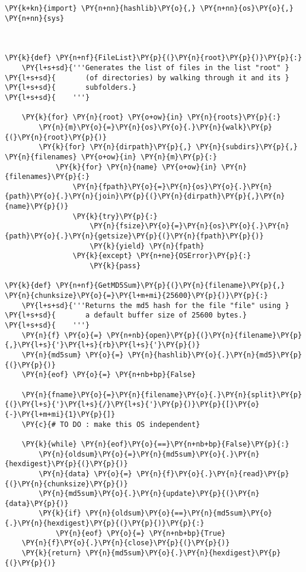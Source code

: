\begin{Verbatim}[commandchars=\\\{\}]
\PY{k+kn}{import} \PY{n+nn}{hashlib}\PY{o}{,} \PY{n+nn}{os}\PY{o}{,} \PY{n+nn}{sys}



\PY{k}{def} \PY{n+nf}{FileList}\PY{p}{(}\PY{n}{root}\PY{p}{)}\PY{p}{:}
    \PY{l+s+sd}{'''Generates the list of files in the list "root" }
\PY{l+s+sd}{       (of directories) by walking through it and its }
\PY{l+s+sd}{       subfolders.}
\PY{l+s+sd}{    '''}

    \PY{k}{for} \PY{n}{root} \PY{o+ow}{in} \PY{n}{roots}\PY{p}{:}
        \PY{n}{m}\PY{o}{=}\PY{n}{os}\PY{o}{.}\PY{n}{walk}\PY{p}{(}\PY{n}{root}\PY{p}{)}
        \PY{k}{for} \PY{n}{dirpath}\PY{p}{,} \PY{n}{subdirs}\PY{p}{,} \PY{n}{filenames} \PY{o+ow}{in} \PY{n}{m}\PY{p}{:}
            \PY{k}{for} \PY{n}{name} \PY{o+ow}{in} \PY{n}{filenames}\PY{p}{:}
                \PY{n}{fpath}\PY{o}{=}\PY{n}{os}\PY{o}{.}\PY{n}{path}\PY{o}{.}\PY{n}{join}\PY{p}{(}\PY{n}{dirpath}\PY{p}{,}\PY{n}{name}\PY{p}{)}
                \PY{k}{try}\PY{p}{:}
                    \PY{n}{fsize}\PY{o}{=}\PY{n}{os}\PY{o}{.}\PY{n}{path}\PY{o}{.}\PY{n}{getsize}\PY{p}{(}\PY{n}{fpath}\PY{p}{)}
                    \PY{k}{yield} \PY{n}{fpath}
                \PY{k}{except} \PY{n+ne}{OSError}\PY{p}{:}
                    \PY{k}{pass}

\PY{k}{def} \PY{n+nf}{GetMD5Sum}\PY{p}{(}\PY{n}{filename}\PY{p}{,} \PY{n}{chunksize}\PY{o}{=}\PY{l+m+mi}{25600}\PY{p}{)}\PY{p}{:}
    \PY{l+s+sd}{'''Returns the md5 hash for the file "file" using }
\PY{l+s+sd}{       a default buffer size of 25600 bytes.}
\PY{l+s+sd}{    '''}
    \PY{n}{f} \PY{o}{=} \PY{n+nb}{open}\PY{p}{(}\PY{n}{filename}\PY{p}{,}\PY{l+s}{'}\PY{l+s}{rb}\PY{l+s}{'}\PY{p}{)}
    \PY{n}{md5sum} \PY{o}{=} \PY{n}{hashlib}\PY{o}{.}\PY{n}{md5}\PY{p}{(}\PY{p}{)}
    \PY{n}{eof} \PY{o}{=} \PY{n+nb+bp}{False}

    \PY{n}{fname}\PY{o}{=}\PY{n}{filename}\PY{o}{.}\PY{n}{split}\PY{p}{(}\PY{l+s}{'}\PY{l+s}{/}\PY{l+s}{'}\PY{p}{)}\PY{p}{[}\PY{o}{-}\PY{l+m+mi}{1}\PY{p}{]}
    \PY{c}{# TO DO : make this OS independent}

    \PY{k}{while} \PY{n}{eof}\PY{o}{==}\PY{n+nb+bp}{False}\PY{p}{:}
        \PY{n}{oldsum}\PY{o}{=}\PY{n}{md5sum}\PY{o}{.}\PY{n}{hexdigest}\PY{p}{(}\PY{p}{)}
        \PY{n}{data} \PY{o}{=} \PY{n}{f}\PY{o}{.}\PY{n}{read}\PY{p}{(}\PY{n}{chunksize}\PY{p}{)}
        \PY{n}{md5sum}\PY{o}{.}\PY{n}{update}\PY{p}{(}\PY{n}{data}\PY{p}{)}
        \PY{k}{if} \PY{n}{oldsum}\PY{o}{==}\PY{n}{md5sum}\PY{o}{.}\PY{n}{hexdigest}\PY{p}{(}\PY{p}{)}\PY{p}{:}
            \PY{n}{eof} \PY{o}{=} \PY{n+nb+bp}{True}
    \PY{n}{f}\PY{o}{.}\PY{n}{close}\PY{p}{(}\PY{p}{)}
    \PY{k}{return} \PY{n}{md5sum}\PY{o}{.}\PY{n}{hexdigest}\PY{p}{(}\PY{p}{)}


\end{Verbatim}

